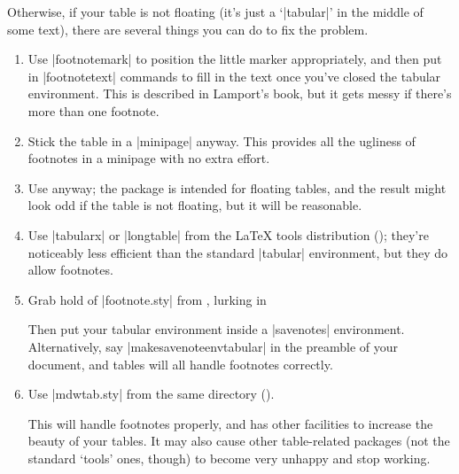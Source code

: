 Otherwise, if your table is not floating (it's just a
`|tabular|' in the middle of some text), there are several
things you can do to fix the problem.
\begin{enumerate}
\item Use \cs|footnotemark| to position the little marker
  appropriately, and then put in \cs|footnotetext| commands to fill in
  the text once you've closed the tabular environment.  This is
  described in Lamport's book, but it gets messy if there's more than
  one footnote.
\item Stick the table in a |minipage| anyway.  This provides
  all the ugliness of footnotes in a minipage with no extra effort.
\item Use  anyway;
  the package is intended for floating tables, and the result might
  look odd if the table is not floating, but it will be reasonable.
\item Use \File|tabularx| or \File|longtable| from the \LaTeX{} tools
  distribution (); they're noticeably less
  efficient than the standard |tabular| environment, but they
  do allow footnotes.
\item Grab hold of \File|footnote.sty| from , lurking in

  Then put your tabular environment inside a |savenotes|
  environment.  Alternatively, say \cs|makesavenoteenv{tabular}| in
  the preamble of your document, and tables will all handle footnotes
  correctly.
\item Use \File|mdwtab.sty| from the same directory
  ().

  This will handle footnotes properly, and has other facilities to
  increase the beauty of your tables.  It may also cause other
  table-related packages (not the standard `tools' ones, though) to
  become very unhappy and stop working.
\end{enumerate}



